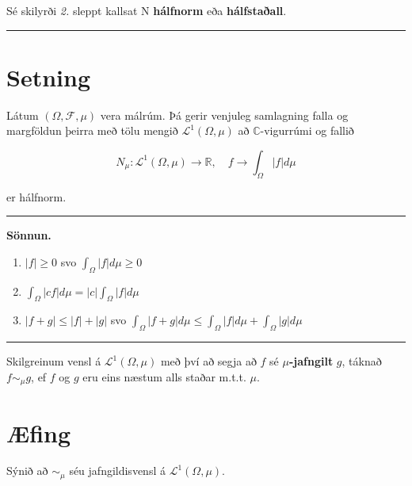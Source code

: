 \documentclass[]{book}
\providecommand{\tightlist}{%
  \setlength{\itemsep}{0pt}\setlength{\parskip}{0pt}}
\begin{document}
Sé skilyrði \emph{2.} sleppt kallsat N \textbf{hálfnorm} eða \textbf{hálfstaðall}.

\begin{center}\rule{0.5\linewidth}{\linethickness}\end{center}

\hypertarget{setning-66}{%
\section*{Setning}\label{setning-66}}

Látum \((\Omega,\mathcal F, \mu)\) vera málrúm. Þá gerir venjuleg samlagning falla og margföldun þeirra með tölu mengið \(\mathcal L^1(\Omega,\mu)\) að \(\mathbb C\)-vigurrúmi og fallið

\[
N_\mu: \mathcal L^1(\Omega,\mu)\rightarrow\mathbb R, \quad f\rightarrow\int_\Omega|f|d\mu
\]

er hálfnorm.

\begin{center}\rule{0.5\linewidth}{\linethickness}\end{center}

\textbf{Sönnun.}

\begin{enumerate}
\def\labelenumi{\arabic{enumi}.}
\tightlist
\item
  \(|f| \geq 0\) svo \(\int_\Omega |f|d\mu \geq 0\)
\item
  \(\int_\Omega |cf|d\mu = |c| \int_\Omega |f|d\mu\)
\item
  \(|f+g| \leq |f| + |g|\) svo \(\int_\Omega |f + g|d\mu \leq \int_\Omega|f|d\mu + \int_\Omega|g|d\mu\)
\end{enumerate}

\begin{center}\rule{0.5\linewidth}{\linethickness}\end{center}

Skilgreinum vensl á \(\mathcal L^1(\Omega,\mu)\) með því að segja að \(f\) sé \(\mu\)\textbf{-jafngilt} \(g\), táknað \(f\sim_\mu g\), ef \(f\) og \(g\) eru eins næstum alls staðar m.t.t. \(\mu\).

\hypertarget{fing-2}{%
\section*{Æfing}\label{fing-2}}

Sýnið að \(\sim_\mu\) séu jafngildisvensl á \(\mathcal L^1(\Omega,\mu)\).
\end{document}
